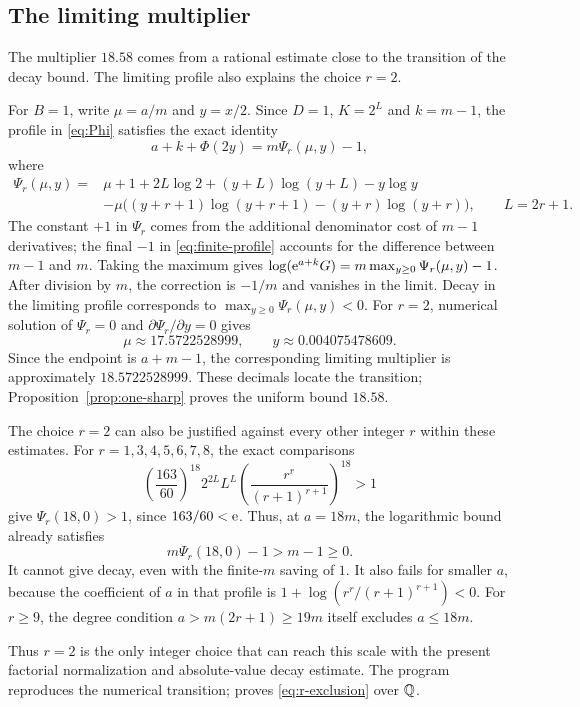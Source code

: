 \subsection{The limiting multiplier}

The multiplier $18.58$ comes from a rational estimate close
to the transition of the decay bound. The limiting profile
also explains the choice $r=2$.

For $B=1$, write $\mu=a/m$ and $y=x/2$. Since $D=1$,
$K=2^L$ and $k=m-1$, the profile in \eqref{eq:Phi} satisfies
the exact identity
\begin{equation}\label{eq:finite-profile}
 a+k+\Phi(2y)=m\Psi_r(\mu,y)-1,
\end{equation}
where
\begin{equation}\label{eq:limiting-profile}
 \begin{split}
 \Psi_r(\mu,y)={}&\mu+1+2L\log2
       +(y+L)\log(y+L)-y\log y\\
 &-\mu\bigl((y+r+1)\log(y+r+1)
                         -(y+r)\log(y+r)\bigr),
 \qquad L=2r+1.
 \end{split}
\end{equation}
The constant $+1$ in $\Psi_r$ comes from the additional denominator cost of
$m-1$ derivatives; the final $-1$ in \eqref{eq:finite-profile}
accounts for the difference between $m-1$ and $m$.
Taking the maximum gives
$\log(\mathrm e^{a+k}G)=m\max_{y\ge0}\Psi_r(\mu,y)-1$.
After division by $m$, the correction is $-1/m$ and vanishes
in the limit. Decay in the limiting profile corresponds to
$\max_{y\ge0}\Psi_r(\mu,y)<0$.
For $r=2$, numerical solution of
$\Psi_r=0$ and $\partial\Psi_r/\partial y=0$ gives
\[
 \mu\approx17.5722528999,\qquad y\approx0.004075478609.
\]
Since the endpoint is $a+m-1$, the corresponding limiting
multiplier is approximately $18.5722528999$.
These decimals locate the transition; Proposition~\ref{prop:one-sharp}
proves the uniform bound $18.58$.

The choice $r=2$ can also be justified against every other
integer $r$ within these estimates. For
$r=1,3,4,5,6,7,8$, the exact comparisons
\begin{equation}\label{eq:r-exclusion}
 \left(\frac{163}{60}\right)^{18}
 2^{2L}L^L
 \left(\frac{r^r}{(r+1)^{r+1}}\right)^{18}>1
\end{equation}
give $\Psi_r(18,0)>1$, since $163/60<\mathrm e$. Thus, at $a=18m$,
the logarithmic bound already satisfies
\[
 m\Psi_r(18,0)-1>m-1\ge0.
\]
It cannot give decay, even with the finite-$m$ saving of $1$.
It also fails for smaller $a$, because the coefficient of $a$
in that profile is
$1+\log(r^r/(r+1)^{r+1})<0$.
For $r\ge9$, the degree condition $a>m(2r+1)\ge19m$
itself excludes $a\le18m$.

Thus $r=2$ is the only integer choice that can
reach this scale with the present factorial normalization
and absolute-value decay estimate. The program
 reproduces the numerical
transition;  proves
\eqref{eq:r-exclusion} over $\mathbb Q$.
